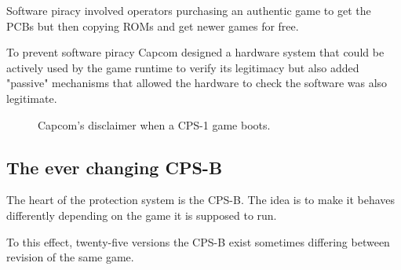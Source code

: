Software piracy involved operators purchasing an authentic game to get the PCBs but then copying ROMs and get newer games for free. 

To prevent software piracy Capcom designed a hardware system that could be actively used by the game runtime to verify its legitimacy but also added "passive" mechanisms that allowed the hardware to check the software was also legitimate.

\begin{figure}[H]
\caption*{Capcom's disclaimer when a CPS-1 game boots.}
\end{figure}

\subsection{The ever changing CPS-B}
The heart of the protection system is the CPS-B. The idea is to make it behaves differently depending on the game it is supposed to run.

To this effect, twenty-five versions the CPS-B exist\cite{mame_cps1_video} sometimes differing between revision of the same game\cite{cpsBNumbers}.


